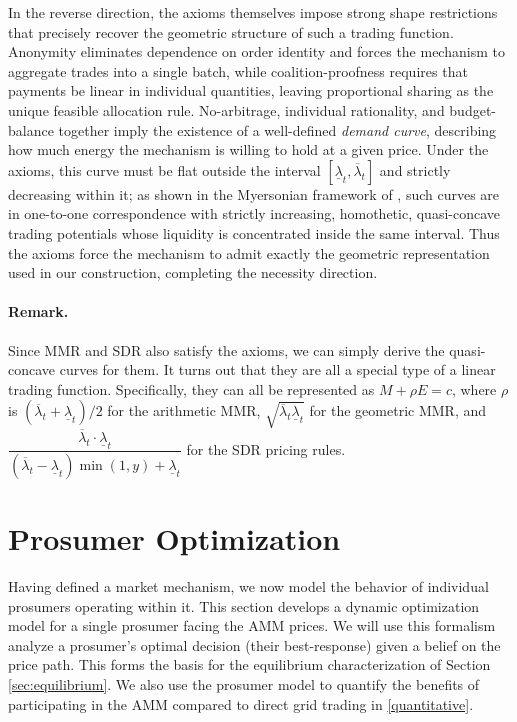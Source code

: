 \documentclass[12pt, notitlepage]{article}
\begin{document}
In the reverse direction, the axioms themselves impose strong shape restrictions that precisely recover the geometric structure of such a trading function. Anonymity eliminates dependence on order identity and forces the mechanism to aggregate trades into a single batch, while coalition-proofness requires that payments be linear in individual quantities, leaving proportional sharing as the unique feasible allocation rule. No-arbitrage, individual rationality, and budget-balance together imply the existence of a well-defined \emph{demand curve}, describing how much energy the mechanism is willing to hold at a given price. Under the axioms, this curve must be flat outside the interval $[\underline{\lambda}_t, \overline{\lambda}_t]$ and strictly decreasing within it; as shown in the Myersonian framework of \citet{milionis2023myersonian}, such curves are in one-to-one correspondence with strictly increasing, homothetic, quasi-concave trading potentials whose liquidity is concentrated inside the same interval. Thus the axioms force the mechanism to admit exactly the geometric representation used in our construction, completing the necessity direction.


\paragraph{Remark.} Since MMR and SDR also satisfy the axioms, we can simply derive the quasi-concave curves for them. It turns out that they are all a special type of a linear trading function. Specifically, they can all be represented as $M+\rho E = c$, where $\rho$ is $(\overline{\lambda}_t + \underline{\lambda}_t)/2$ for the arithmetic MMR, $\sqrt{\overline{\lambda}_t \underline{\lambda}_t}$ for the geometric MMR, and $\dfrac{\overline{\lambda}_t \cdot \underline{\lambda}_t}{ (\overline{\lambda}_t - \underline{\lambda}_t) \min(1,y) + \underline{\lambda}_t}$ for the SDR pricing rules. 





\section{Prosumer Optimization}
\label{sec:prosumer_model}



Having defined a market mechanism, we now model the behavior of individual prosumers operating within it. This section develops a dynamic optimization model for a single prosumer facing the AMM prices. We will use this formalism analyze a prosumer's optimal decision (their best-response) given a belief on the price path. This forms the basis for the equilibrium characterization of Section \ref{sec:equilibrium}. We also use the prosumer model to quantify the benefits of participating in the AMM compared to direct grid trading in \cref{quantitative}.
\end{document}
